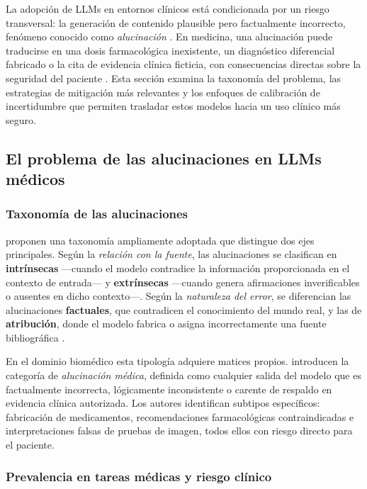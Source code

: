 La adopción de \ac{LLM}s en entornos clínicos está condicionada por un riesgo transversal: la generación de contenido plausible pero factualmente incorrecto, fenómeno conocido como \emph{alucinación} \parencite{Ji2023hallucination}. En medicina, una alucinación puede traducirse en una dosis farmacológica inexistente, un diagnóstico diferencial fabricado o la cita de evidencia clínica ficticia, con consecuencias directas sobre la seguridad del paciente \parencite{kim2025hallucination,Ahmad2023}. Esta sección examina la taxonomía del problema, las estrategias de mitigación más relevantes y los enfoques de calibración de incertidumbre que permiten trasladar estos modelos hacia un uso clínico más seguro.

\subsection{El problema de las alucinaciones en \acs{LLM}s médicos}
\label{subsec:problema_alucinaciones}

\subsubsection{Taxonomía de las alucinaciones}

\textcite{Huang2025survey} proponen una taxonomía ampliamente adoptada que distingue dos ejes principales. Según la \emph{relación con la fuente}, las alucinaciones se clasifican en \textbf{intrínsecas} ---cuando el modelo contradice la información proporcionada en el contexto de entrada--- y \textbf{extrínsecas} ---cuando genera afirmaciones inverificables o ausentes en dicho contexto---. Según la \emph{naturaleza del error}, se diferencian las alucinaciones \textbf{factuales}, que contradicen el conocimiento del mundo real, y las de \textbf{atribución}, donde el modelo fabrica o asigna incorrectamente una fuente bibliográfica \parencite{Ji2023hallucination}.

En el dominio biomédico esta tipología adquiere matices propios. \textcite{kim2025hallucination} introducen la categoría de \emph{alucinación médica}, definida como cualquier salida del modelo que es factualmente incorrecta, lógicamente inconsistente o carente de respaldo en evidencia clínica autorizada. Los autores identifican subtipos específicos: fabricación de medicamentos, recomendaciones farmacológicas contraindicadas e interpretaciones falsas de pruebas de imagen, todos ellos con riesgo directo para el paciente.

\subsubsection{Prevalencia en tareas médicas y riesgo clínico}

